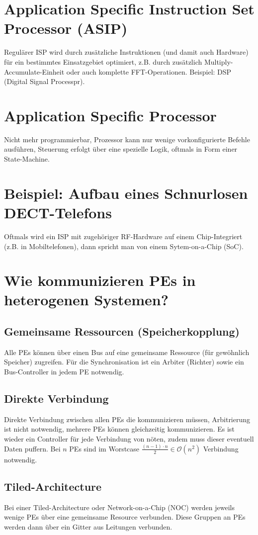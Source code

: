 \section{Application Specific Instruction Set Processor (ASIP)}
Regulärer ISP wird durch zusätzliche Instruktionen (und damit auch Hardware) für ein bestimmtes Einsatzgebiet optimiert, 
z.B. durch zusätzlich \glqq{}Multiply-Accumulate\grqq{}-Einheit oder auch komplette FFT-Operationen.
Beispiel: DSP (Digital Signal Processpr).

\section{Application Specific Processor}
Nicht mehr programmierbar, Prozessor kann nur wenige vorkonfigurierte Befehle ausführen, Steuerung erfolgt über eine spezielle Logik, oftmals in Form einer
State-Machine.

\section{Beispiel: Aufbau eines Schnurlosen DECT-Telefons}
Oftmals wird ein ISP mit zugehöriger RF-Hardware auf einem Chip-Integriert (z.B. in Mobiltelefonen), dann spricht man von einem Sytem-on-a-Chip (SoC).

\section{Wie kommunizieren PEs in heterogenen Systemen?}
\subsection{Gemeinsame Ressourcen (Speicherkopplung)}
Alle PEs können über einen Bus auf eine gemeinsame Ressource (für gewöhnlich Speicher) zugreifen. 
Für die Synchronisation ist ein \glqq{}Arbiter\grqq{} (Richter) sowie ein Bus-Controller in jedem PE notwendig.

\subsection{Direkte Verbindung}
Direkte Verbindung zwischen allen PEs die kommunizieren müssen, Arbitrierung ist nicht notwendig, mehrere PEs können gleichzeitig kommunizieren. 
Es ist wieder ein Controller für jede Verbindung von nöten, zudem muss dieser eventuell Daten puffern. 
Bei $n$ PEs sind im Worstcase $\frac{(n-1)\cdot n}{2} \in  \mathcal{O}(n^2)$ Verbindung notwendig.

\subsection{Tiled-Architecture}
Bei einer Tiled-Architecture oder Network-on-a-Chip (NOC) werden jeweils wenige PEs über eine gemeinsame Resource verbunden. 
Diese Gruppen an PEs werden dann über ein Gitter aus Leitungen verbunden.
